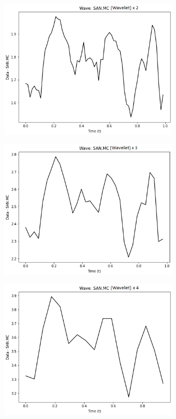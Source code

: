 \documentclass[12pt,a4paper]{article}
\begin{document}
\begin{figure}[H]
\centering
\begin{subfigure}{.3\textwidth}
  \centering
  \includegraphics[width=.9\linewidth]{serie wavelet (1)}
  \label{fig:sub1}
\end{subfigure}%
\begin{subfigure}{.3\textwidth}
  \centering
  \includegraphics[width=.9\linewidth]{serie wavelet (2)}
  \label{fig:sub1}
\end{subfigure}%
\begin{subfigure}{.3\textwidth}
  \centering
  \includegraphics[width=.9\linewidth]{serie wavelet (3)}

\end{subfigure}
\end{figure}
\end{document}

